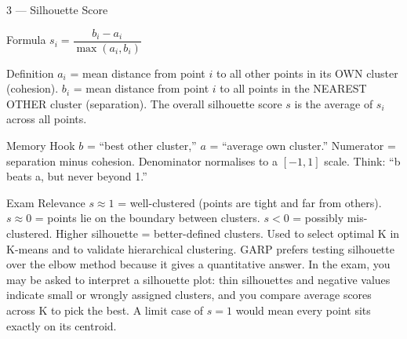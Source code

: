 \documentclass[aspectratio=169,8pt]{beamer}
\begin{document}
	\begin{frame}{3 --- Silhouette Score}
		\begin{block}{Formula}
			$s_i = \dfrac{b_i - a_i}{\max(a_i, b_i)}$
		\end{block}
		\begin{block}{Definition}
			$a_i$ = mean distance from point $i$ to all other points in its OWN cluster (cohesion). $b_i$ = mean distance from point $i$ to all points in the NEAREST OTHER cluster (separation). The overall silhouette score $s$ is the average of $s_i$ across all points.
		\end{block}
		\begin{block}{Memory Hook}
			$b$ = ``best other cluster,'' $a$ = ``average own cluster.'' Numerator = separation minus cohesion. Denominator normalises to a $[-1,1]$ scale. Think: ``b beats a, but never beyond 1.''
		\end{block}
		\begin{block}{Exam Relevance}
			$s \approx 1$ = well-clustered (points are tight and far from others). $s \approx 0$ = points lie on the boundary between clusters. $s < 0$ = possibly mis-clustered. Higher silhouette = better-defined clusters. Used to select optimal K in K-means and to validate hierarchical clustering. GARP prefers testing silhouette over the elbow method because it gives a quantitative answer. In the exam, you may be asked to interpret a silhouette plot: thin silhouettes and negative values indicate small or wrongly assigned clusters, and you compare average scores across K to pick the best. A limit case of $s = 1$ would mean every point sits exactly on its centroid.
		\end{block}
	\end{frame}
	
\end{document}
